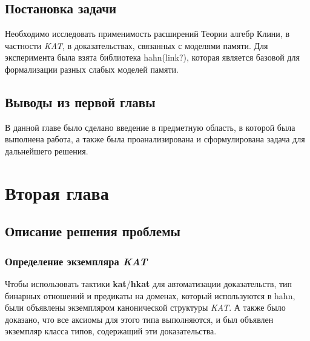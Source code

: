 \documentclass[times
              ]{itmo-student-thesis}
\begin{document}
  \section{Постановка задачи}
    Необходимо исследовать применимость расширений Теории алгебр Клини, в частности \textit{KAT}, в доказательствах, связанных с моделями памяти.
    Для эксперимента была взята библиотека hahn(link?), которая является базовой для формализации разных слабых моделей памяти.

  \section{Выводы из первой главы}
    В данной главе было сделано введение в предметную область, в которой была выполнена работа,
    а также была проанализирована и сформулирована задача для дальнейшего решения.
\chapter{Вторая глава}

  \section{Описание решения проблемы}

    \subsection{Определение экземпляра \textit{KAT}}
    Чтобы использовать тактики \textbf{kat}/\textbf{hkat} для автоматизации доказательств,
    тип бинарных отношений и предикаты на доменах, который используются в hahn, были объявлены экземпляром канонической структуры \textit{KAT}.
    А также было доказано, что все аксиомы для этого типа выполняются, и был объявлен экземпляр класса типов, содержащий эти доказательства.
\end{document}
